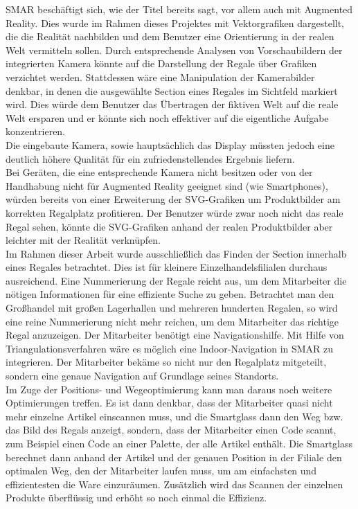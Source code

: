 \ac{SMAR} beschäftigt sich, wie der Titel bereits sagt, vor allem auch mit Augmented Reality. Dies wurde im Rahmen dieses Projektes mit Vektorgrafiken dargestellt, die die Realität nachbilden und dem Benutzer eine Orientierung in der realen Welt vermitteln sollen. Durch entsprechende Analysen von Vorschaubildern der integrierten Kamera könnte auf die Darstellung der Regale über Grafiken verzichtet werden. Stattdessen wäre eine Manipulation der Kamerabilder denkbar, in denen die ausgewählte Section eines Regales im Sichtfeld markiert wird. Dies würde dem Benutzer das Übertragen der fiktiven Welt auf die reale Welt ersparen und er könnte sich noch effektiver auf die eigentliche Aufgabe konzentrieren.\\
Die eingebaute Kamera, sowie hauptsächlich das Display müssten jedoch eine deutlich höhere Qualität für ein zufriedenstellendes Ergebnis liefern.\\
Bei Geräten, die eine entsprechende Kamera nicht besitzen oder von der Handhabung nicht für Augmented Reality geeignet sind (wie \zB Smartphones), würden bereits von einer Erweiterung der SVG-Grafiken um Produktbilder am korrekten Regalplatz profitieren. Der Benutzer würde zwar noch nicht das reale Regal sehen, könnte die SVG-Grafiken anhand der realen Produktbilder aber leichter mit der Realität verknüpfen.\\

Im Rahmen dieser Arbeit wurde ausschließlich das Finden der Section innerhalb eines Regales betrachtet. Dies ist für kleinere Einzelhandelsfilialen durchaus ausreichend. Eine Nummerierung der Regale reicht aus, um dem Mitarbeiter die nötigen Informationen für eine effiziente Suche zu geben. Betrachtet man den Großhandel mit großen Lagerhallen und mehreren hunderten Regalen, so wird eine reine Nummerierung nicht mehr reichen, um dem Mitarbeiter das richtige Regal anzuzeigen. Der Mitarbeiter benötigt eine Navigationshilfe. Mit Hilfe von Triangulationsverfahren wäre es möglich eine Indoor-Navigation in \ac{SMAR} zu integrieren. Der Mitarbeiter bekäme so nicht nur den Regalplatz mitgeteilt, sondern eine genaue Navigation auf Grundlage seines Standorts.\\
Im Zuge der Positions- und Wegeoptimierung kann man daraus noch weitere Optimierungen treffen. Es ist dann denkbar, dass der Mitarbeiter quasi nicht mehr einzelne Artikel einscannen muss, und die Smartglass dann den Weg bzw. das Bild des Regals anzeigt, sondern, dass der Mitarbeiter einen Code scannt, zum Beispiel einen Code an einer Palette, der alle Artikel enthält. Die Smartglass berechnet dann anhand der Artikel und der genauen Position in der Filiale den optimalen Weg, den der Mitarbeiter laufen muss, um am einfachsten und effizientesten die Ware einzuräumen. Zusätzlich wird das Scannen der einzelnen Produkte überflüssig und erhöht so noch einmal die Effizienz.\\

